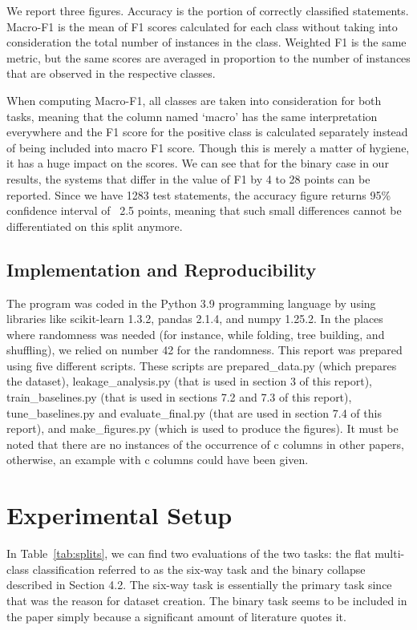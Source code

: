 We report three figures. Accuracy is the portion of correctly classified statements. Macro-F1 is the mean of F1 scores calculated for each class without taking into consideration the total number of instances in the class. Weighted F1 is the same metric, but the same scores are averaged in proportion to the number of instances that are observed in the respective classes.

When computing Macro-F1, all classes are taken into consideration for both tasks, meaning that the column named `macro' has the same interpretation everywhere and the F1 score for the positive class is calculated separately instead of being included into macro F1 score. Though this is merely a matter of hygiene, it has a huge impact on the scores. We can see that for the binary case in our results, the systems that differ in the value of F1 by 4 to 28 points can be reported. Since we have 1283 test statements, the accuracy figure returns 95\% confidence interval of ~2.5 points, meaning that such small differences cannot be differentiated on this split anymore.

\subsection{Implementation and Reproducibility}

The program was coded in the Python 3.9 programming language by using libraries like scikit-learn 1.3.2, pandas 2.1.4, and numpy 1.25.2. In the places where randomness was needed (for instance, while folding, tree building, and shuffling), we relied on number 42 for the randomness. This report was prepared using five different scripts. These scripts are prepared\_data.py (which prepares the dataset), leakage\_analysis.py (that is used in section 3 of this report), train\_baselines.py (that is used in sections 7.2 and 7.3 of this report), tune\_baselines.py and evaluate\_final.py (that are used in section 7.4 of this report), and make\_figures.py (which is used to produce the figures). It must be noted that there are no instances of the occurrence of c columns in other papers, otherwise, an example with c columns could have been given.

\section{Experimental Setup}

In Table~\ref{tab:splits}, we can find two evaluations of the two tasks: the flat multi-class classification referred to as the six-way task and the binary collapse described in Section 4.2. The six-way task is essentially the primary task since that was the reason for dataset creation. The binary task seems to be included in the paper simply because a significant amount of literature quotes it.

